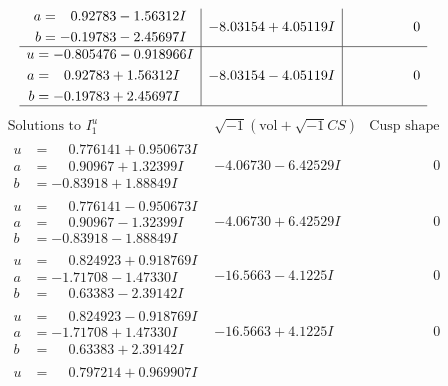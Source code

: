 \documentclass[1p]{elsarticle_modified}
\theoremstyle{definition}
\newcommand{\I}{\sqrt{-1}}
\begin{document}
$$\begin{array}{c|c|c}
\begin{aligned}
a &= \phantom{-}0.92783 - 1.56312 I \\
b &= -0.19783 - 2.45697 I\end{aligned}
 & -8.03154 + 4.05119 I & \phantom{-0.000000 } 0 \\ \hline\begin{aligned}
u &= -0.805476 - 0.918966 I \\
a &= \phantom{-}0.92783 + 1.56312 I \\
b &= -0.19783 + 2.45697 I\end{aligned}
 & -8.03154 - 4.05119 I & \phantom{-0.000000 } 0\\
 \hline 
 \end{array}$$\newpage$$\begin{array}{c|c|c}  
\text{Solutions to }I^u_{1}& \I (\text{vol} + \sqrt{-1}CS) & \text{Cusp shape}\\
 \hline 
\begin{aligned}
u &= \phantom{-}0.776141 + 0.950673 I \\
a &= \phantom{-}0.90967 + 1.32399 I \\
b &= -0.83918 + 1.88849 I\end{aligned}
 & -4.06730 - 6.42529 I & \phantom{-0.000000 } 0 \\ \hline\begin{aligned}
u &= \phantom{-}0.776141 - 0.950673 I \\
a &= \phantom{-}0.90967 - 1.32399 I \\
b &= -0.83918 - 1.88849 I\end{aligned}
 & -4.06730 + 6.42529 I & \phantom{-0.000000 } 0 \\ \hline\begin{aligned}
u &= \phantom{-}0.824923 + 0.918769 I \\
a &= -1.71708 - 1.47330 I \\
b &= \phantom{-}0.63383 - 2.39142 I\end{aligned}
 & -16.5663 - 4.1225 I & \phantom{-0.000000 } 0 \\ \hline\begin{aligned}
u &= \phantom{-}0.824923 - 0.918769 I \\
a &= -1.71708 + 1.47330 I \\
b &= \phantom{-}0.63383 + 2.39142 I\end{aligned}
 & -16.5663 + 4.1225 I & \phantom{-0.000000 } 0 \\ \hline\begin{aligned}
u &= \phantom{-}0.797214 + 0.969907 I \\

\end{aligned}
\end{array}$$
\end{document}
